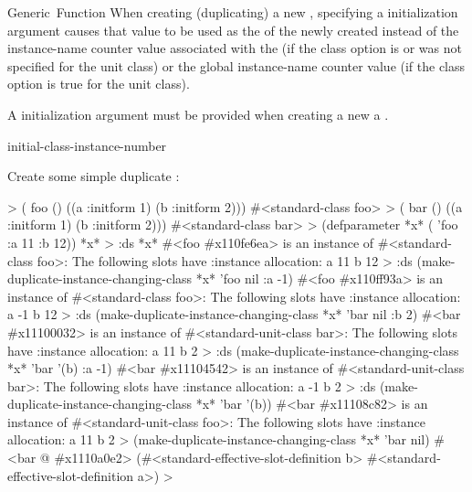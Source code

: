 \documentclass[10pt,twoside,english,pdftex]{article}
\begin{document}
\begin{functiondoc}{Generic~Function}
When creating (duplicating) a new , specifying a
 initialization argument causes that value to be
used as the  of the newly created 
instead of the instance-name counter value associated with the
 (if the 
class option is \nil{} or was not specified for the unit class) or the global
instance-name counter value (if the
 class option is true for the
unit class).

A  initialization argument must be provided when
creating a new a .

\begin{alsos}{initial-class-instance-number}
\end{alsos}

\fnexamples
Create some simple duplicate :
%
%
%
%
%
\W\supp
\begin{example}
  > ( foo () 
       ((a :initform 1)
        (b :initform 2)))
  #<standard-class foo>
  > ( bar () 
       ((a :initform 1)
        (b :initform 2)))
  #<standard-class bar>
  > (defparameter *x* ( 'foo :a 11 :b 12))
  *x*
  > :ds *x*
  #<foo #x110fe6ea> is an instance of #<standard-class foo>:
   The following slots have :instance allocation:
    a   11
    b   12
  > :ds (make-duplicate-instance-changing-class *x* 'foo nil :a -1)
  #<foo #x110ff93a> is an instance of #<standard-class foo>:
   The following slots have :instance allocation:
    a   -1
    b   12\goodpagebreak
  > :ds (make-duplicate-instance-changing-class *x* 'bar nil :b 2)
  #<bar #x11100032> is an instance of #<standard-unit-class bar>:
   The following slots have :instance allocation:
    a   11
    b   2\goodpagebreak
  > :ds (make-duplicate-instance-changing-class *x* 'bar '(b) :a -1)
  #<bar #x11104542> is an instance of #<standard-unit-class bar>:
   The following slots have :instance allocation:
    a   -1
    b   2
  > :ds (make-duplicate-instance-changing-class *x* 'bar '(b))
  #<bar #x11108c82> is an instance of #<standard-unit-class foo>:
   The following slots have :instance allocation:
    a   11
    b   2
  > (make-duplicate-instance-changing-class *x* 'bar nil)
  #<bar @ #x1110a0e2>
  (#<standard-effective-slot-definition b>
   #<standard-effective-slot-definition a>)
  >
\end{example}


\end{functiondoc}
\end{document}
